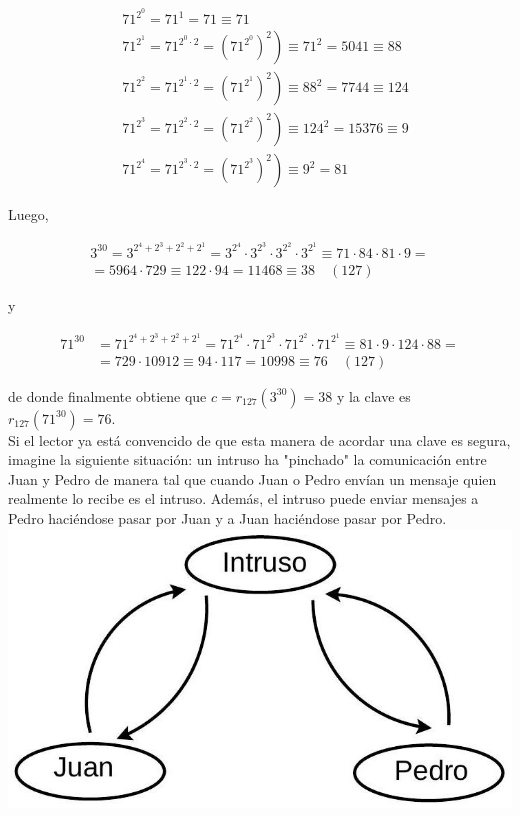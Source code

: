 \documentclass[10pt]{article}
\begin{document}
\begin{align*}
& 71^{2^{0}}=71^{1}=71 \equiv 71 \\
& \left.71^{2^{1}}=71^{2^{0} \cdot 2}=\left(71^{2^{0}}\right)^{2}\right) \equiv 71^{2}=5041 \equiv 88  \tag{127}\\
& \left.71^{2^{2}}=71^{2^{1} \cdot 2}=\left(71^{2^{1}}\right)^{2}\right) \equiv 88^{2}=7744 \equiv 124  \tag{127}\\
& \left.71^{2^{3}}=71^{2^{2} \cdot 2}=\left(71^{2^{2}}\right)^{2}\right) \equiv 124^{2}=15376 \equiv 9  \tag{127}\\
& \left.71^{2^{4}}=71^{2^{3} \cdot 2}=\left(71^{2^{3}}\right)^{2}\right) \equiv 9^{2}=81 \tag{127}
\end{align*}


Luego,


\begin{gather*}
3^{30}=3^{2^{4}+2^{3}+2^{2}+2^{1}}=3^{2^{4}} \cdot 3^{2^{3}} \cdot 3^{2^{2}} \cdot 3^{2^{1}} \equiv 71 \cdot 84 \cdot 81 \cdot 9= \\
=5964 \cdot 729 \equiv 122 \cdot 94=11468 \equiv 38 \quad(127) \tag{127}
\end{gather*}


y


\begin{align*}
71^{30} & =71^{2^{4}+2^{3}+2^{2}+2^{1}}=71^{2^{4}} \cdot 71^{2^{3}} \cdot 71^{2^{2}} \cdot 71^{2^{1}} \equiv 81 \cdot 9 \cdot 124 \cdot 88= \\
& =729 \cdot 10912 \equiv 94 \cdot 117=10998 \equiv 76 \quad(127) \tag{127}
\end{align*}


de donde finalmente obtiene que $c=r_{127}\left(3^{30}\right)=38$ y la clave es $r_{127}\left(71^{30}\right)=76$.\\
Si el lector ya está convencido de que esta manera de acordar una clave es segura, imagine la siguiente situación: un intruso ha "pinchado" la comunicación entre Juan y Pedro de manera tal que cuando Juan o Pedro envían un mensaje quien realmente lo recibe es el intruso. Además, el intruso puede enviar mensajes a Pedro haciéndose pasar por Juan y a Juan haciéndose pasar por Pedro.\\
\includegraphics[max width=\textwidth, center]{2025_09_05_76a00afb34b0e185ce5bg-06}
\end{document}
